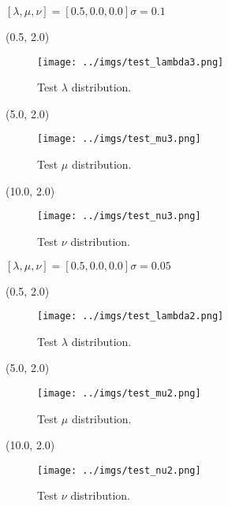 \documentclass[10pt, xcolor={dvipsnames}, aspectratio = 169, sans,mathserif]{beamer}
\begin{document}
\begin{frame}{$[\lambda, \mu, \nu] = [0.5, 0.0, 0.0] \sigma = 0.1$}

\begin{textblock}{5.0}(0.5, 2.0)
\begin{figure}
    \centering
    \texttt{[image: ../imgs/test\_lambda3.png]}
    \caption{Test $\lambda$ distribution.}
\end{figure}
\end{textblock}

\begin{textblock}{5.0}(5.0, 2.0)
\begin{figure}
    \centering
    \texttt{[image: ../imgs/test\_mu3.png]}
    \caption{Test $\mu$ distribution.}
\end{figure}
\end{textblock}

\begin{textblock}{5.0}(10.0, 2.0)
\begin{figure}
    \centering
    \texttt{[image: ../imgs/test\_nu3.png]}
    \caption{Test $\nu$ distribution.}
\end{figure}
\end{textblock}

\end{frame}

\begin{frame}{$[\lambda, \mu, \nu] = [0.5, 0.0, 0.0] \sigma = 0.05$}

\begin{textblock}{5.0}(0.5, 2.0)
\begin{figure}
    \centering
    \texttt{[image: ../imgs/test\_lambda2.png]}
    \caption{Test $\lambda$ distribution.}
\end{figure}
\end{textblock}

\begin{textblock}{5.0}(5.0, 2.0)
\begin{figure}
    \centering
    \texttt{[image: ../imgs/test\_mu2.png]}
    \caption{Test $\mu$ distribution.}
\end{figure}
\end{textblock}

\begin{textblock}{5.0}(10.0, 2.0)
\begin{figure}
    \centering
    \texttt{[image: ../imgs/test\_nu2.png]}
    \caption{Test $\nu$ distribution.}
\end{figure}
\end{textblock}

\end{frame}
\end{document}
